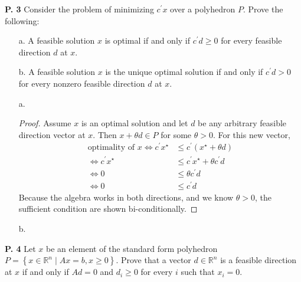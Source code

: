 \documentclass{article}
\begin{document}
\begin{jacklist}
\newpage
    \begin{framed} 
    \item [\textbf{P. 3}] Consider the problem of minimizing $c^{\prime} x$ over a polyhedron $P$. Prove the following:
        \begin{itemize}
            \item [a.] A feasible solution $x$ is optimal if and only if $c^{\prime} d \geq 0$ for every feasible direction $d$ at $x$. 
            \item [b.] A feasible solution $x$ is the unique optimal solution if and only if $c^{\prime} d>0$ 
                for every nonzero feasible direction $d$ at $x$. 
        \end{itemize}
    \end{framed}
    \begin{itemize}
        \item [a.] 
            \begin{proof}
                Assume $x$ is an optimal solution and let $d$ be any arbitrary feasible direction vector at $x$. Then $x + \theta d 
                \in P$ for some $\theta > 0$. For this new vector, 
                \begin{align*}
                    \text{optimality of } x \Leftrightarrow c^\prime x^\star &\leq c^\prime(x^\star + \theta d) \\
                    \Leftrightarrow c^\prime x^\star &\leq c^\prime x^\star + \theta c^\prime d \\
                    \Leftrightarrow 0 &\leq \theta c^\prime d \\
                    \Leftrightarrow 0 &\leq c^\prime d
                \end{align*}
                Because the algebra works in both directions, and we know $\theta > 0$, the sufficient condition are shown 
                bi-conditionally. 
            \end{proof}
        \item [b.]
    \end{itemize}

\newpage
    \begin{framed} 
    \item [\textbf{P. 4}] Let $x$ be an element of the standard form polyhedron 
        $P=\left\{x \in \mathbb{R}^{n} \mid A x=b, x \geq 0\right\}$. Prove that a vector $d \in \mathbb{R}^{n}$ is a feasible 
        direction at $x$ if and only if $A d=0$ and $d_{i} \geq 0$ for every $i$ such that $x_{i}=0$.
    \end{framed}


\end{jacklist}
\end{document}
